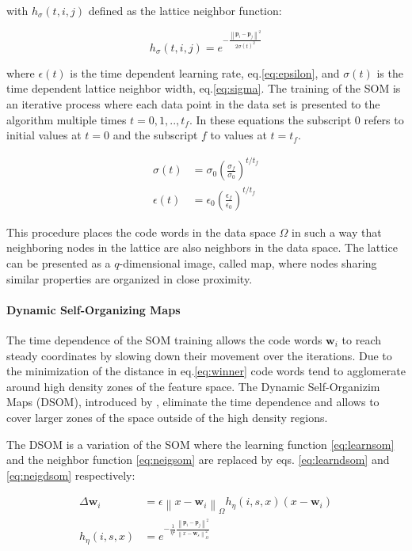 with $h_\sigma(t,i,j)$ defined as the lattice neighbor function:

\begin{equation}
h_\sigma(t,i,j) = e^{-\frac{\left\lVert \boldsymbol{p}_i - \boldsymbol{p}_j \right\rVert^2}{2\sigma(t)^2}} \label{eq:neigsom}
\end{equation}

where $\epsilon(t)$ is the time dependent learning rate, eq.\eqref{eq:epsilon}, and $\sigma(t)$ is the time dependent lattice neighbor width, eq.\eqref{eq:sigma}. The training of the SOM is an iterative process where each data point in the data set is presented to the algorithm multiple times $t={0, 1,..,t_f}$. In these equations the subscript $0$ refers to initial values at $t=0$ and the subscript $f$ to values at $t=t_f$.

\begin{align}
\sigma(t) & = \sigma_0 \left(\frac{\sigma_f}{\sigma_0}\right)^{t/t_f} \label{eq:sigma} \\
\epsilon(t) & = \epsilon_0 \left(\frac{\epsilon_f}{\epsilon_0}\right)^{t/t_f} \label{eq:epsilon}
\end{align}

This procedure places the code words in the data space $\Omega$ in such a way that neighboring nodes in the lattice are also neighbors in the data space. The lattice can be presented as a $q$-dimensional image, called map, where nodes sharing similar properties are organized in close proximity.

\paragraph{Dynamic Self-Organizing Maps}
The time dependence of the SOM training allows the code words $\boldsymbol{w}_i$ to reach steady coordinates by slowing down their movement over the iterations. Due to the minimization of the distance in eq.\eqref{eq:winner} code words tend to agglomerate around high density zones of the feature space. The Dynamic Self-Organizim Maps (DSOM), introduced by \citep{Rougier2011}, eliminate the time dependence and allows to cover larger zones of the space outside of the high density regions.

The DSOM is a variation of the SOM where the learning function \eqref{eq:learnsom} and the neighbor function \eqref{eq:neigsom} are replaced by eqs. \eqref{eq:learndsom} and \eqref{eq:neigdsom} respectively:

\begin{align}
\Delta \boldsymbol{w}_i & = \epsilon \left\lVert x - \boldsymbol{w}_i \right\rVert_\Omega h_\eta(i,s,x)(x-\boldsymbol{w}_i) \label{eq:learndsom} \\
h_\eta(i,s,x) & = e^{-\frac{1}{\eta^2}\frac{\left\lVert \boldsymbol{p}_i - \boldsymbol{p}_j \right\rVert^2}{\left\lVert x - \boldsymbol{w}_s \right\rVert_\Omega^2}} \label{eq:neigdsom} 
\end{align}


